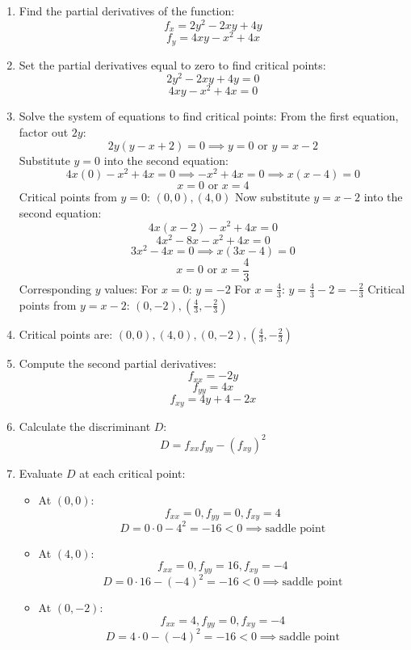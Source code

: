 \documentclass[reqno, 12pt]{amsart}
\begin{document}
\begin{itemize}
    \begin{answerbox}
      \begin{enumerate}
        \item Find the partial derivatives of the function:
          \[f_x = 2y^2 - 2xy + 4y\]
          \[f_y = 4xy - x^2 + 4x\]
        \item Set the partial derivatives equal to zero to find critical points:
          \[2y^2 - 2xy + 4y = 0\]
          \[4xy - x^2 + 4x = 0\]
        \item Solve the system of equations to find critical points:
          From the first equation, factor out \(2y\):
          \[2y(y - x + 2) = 0 \implies y = 0 \text{ or } y = x - 2\]
          Substitute \(y = 0\) into the second equation:
          \[4x(0) - x^2 + 4x = 0 \implies -x^2 + 4x = 0 \implies x(x - 4) = 0\]
          \[x = 0 \text{ or } x = 4\]
          Critical points from \(y = 0\): \((0,0), (4,0)\)
          Now substitute \(y = x - 2\) into the second equation:
          \[4x(x - 2) - x^2 + 4x = 0\]
          \[4x^2 - 8x - x^2 + 4x = 0\]
          \[3x^2 - 4x = 0 \implies x(3x - 4) = 0\]
          \[x = 0 \text{ or } x = \frac{4}{3}\]
          Corresponding \(y\) values:
          For \(x = 0\): \(y = -2\)
          For \(x = \frac{4}{3}\): \(y = \frac{4}{3} - 2 = -\frac{2}{3}\)
          Critical points from \(y = x - 2\): \((0,-2), (\frac{4}{3},-\frac{2}{3})\)
        \item Critical points are: \((0,0), (4,0), (0,-2), (\frac{4}{3},-\frac{2}{3})\)
        \item Compute the second partial derivatives:
          \[f_{xx} = -2y\]
          \[f_{yy} = 4x\]
          \[f_{xy} = 4y + 4 - 2x\]
        \item Calculate the discriminant \(D\):
          \[D = f_{xx}f_{yy} - (f_{xy})^2\]
        \item Evaluate \(D\) at each critical point:
          \begin{itemize}
            \item At \((0,0)\):
              \[f_{xx} = 0, f_{yy} = 0, f_{xy} = 4\]
              \[D = 0 \cdot 0 - 4^2 = -16 < 0 \implies \text{saddle point}\]
            \item At \((4,0)\):
              \[f_{xx} = 0, f_{yy} = 16, f_{xy} = -4\]
              \[D = 0 \cdot 16 - (-4)^2 = -16 < 0 \implies \text{saddle point}\]
            \item At \((0,-2)\):
              \[f_{xx} = 4, f_{yy} = 0, f_{xy} = -4\]
              \[D = 4 \cdot 0 - (-4)^2 = -16 < 0 \implies \text{saddle point}\]

\end{itemize}
\end{enumerate}
\end{answerbox}
\end{itemize}
\end{document}
